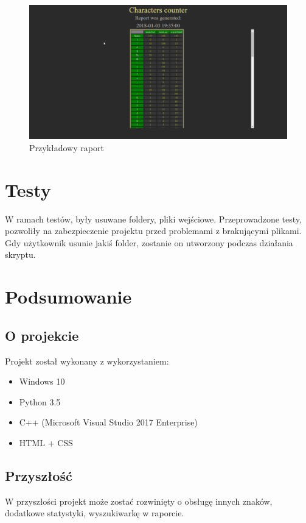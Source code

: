 \documentclass[]{article}
\begin{document}
\begin{figure}[H]
	\centering
	\includegraphics[width=1\linewidth]{report}
	\caption{Przykładowy raport}
	\label{fig:report}
\end{figure}\clearpage
\section{Testy}
W ramach testów, były usuwane foldery, pliki wejściowe. Przeprowadzone testy, pozwoliły na zabezpieczenie projektu przed problemami z brakującymi plikami. Gdy użytkownik usunie jakiś folder, zostanie on utworzony podczas działania skryptu.
\section{Podsumowanie}
\subsection{O projekcie}
Projekt został wykonany z wykorzystaniem:
\begin{itemize}
\item Windows 10
\item Python 3.5
\item C++ (Microsoft Visual Studio 2017 Enterprise)
\item HTML + CSS
\end{itemize}
\subsection{Przyszłość}
W przyszłości projekt może zostać rozwinięty o obsługę innych znaków, dodatkowe statystyki, wyszukiwarkę w raporcie.
\end{document}
